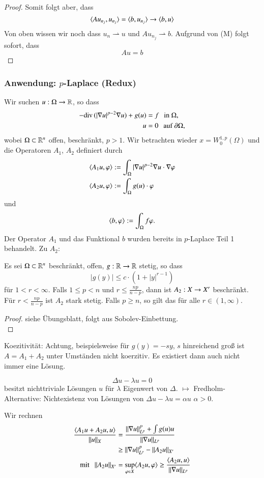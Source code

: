 \begin{proof}
    \noindent Somit folgt aber, dass
    \[
        \langle Au_{n_j}, u_{n_j} \rangle = \langle b,u_{n_j}\rangle \rightarrow \langle b,u\rangle
    \]
    Von oben wissen wir noch dass $u_n\rightharpoonup u$ und $Au_{n_j}\rightharpoonup b$. Aufgrund von
    (M) folgt sofort, dass
    \[
        Au=b
    \]
\end{proof}

\subsubsection*{Anwendung: $p$-Laplace (Redux)}

Wir suchen $u:\Omega\rightarrow \mathbb{R}$, so dass
\begin{align*}
    -\mathrm{div}\, (|\nabla u |^{p-2}\nabla u) + g(u)&= f \hspace{.25cm} \text{in }\Omega,\\
     u&=0 \hspace{.25cm}\text{auf }\partial \Omega,
\end{align*}
wobei $\Omega\subset\mathbb{R}^n$ offen, beschränkt, $p>1$. Wir betrachten wieder $x=W^{1,p}_0(\Omega)$ und die
Operatoren $A_1$, $A_2$ definiert durch
\begin{align*}
    \langle A_1u,\varphi\rangle &:= \int_{\Omega} |\nabla u |^{p-2} \nabla u \cdot \nabla\varphi\\
    \langle A_2u,\varphi\rangle &:= \int_\Omega g(u)\cdot \varphi
\end{align*}
und
\[
    \langle b,\varphi \rangle := \int_\Omega f\varphi.
\]
Der Operator $A_1$ und das Funktional $b$ wurden bereits in $p$-Laplace Teil 1 behandelt. Zu $A_2$:

\begin{lem}\label{4.17}
    Es sei $\Omega\subset \mathbb{R}^n$ beschränkt, offen, $g:\mathbb{R}\rightarrow \mathbb{R}$ stetig, so dass
    \[
        |g(y)|\leq c \cdot(1+|y|^{r-1})
    \]
    für  $1<r<\infty$.
    Falls $1\leq p < n$ und $r\leq \frac{np}{n-p}$, dann ist $A_2:X\rightarrow X'$ beschränkt. Für
    $r<\frac{np}{n-p}$ ist $A_2$ stark stetig. Falls $p\geq n$, so gilt das für alle $r\in (1,\infty)$.
\end{lem}

\begin{proof}
    siehe Übungsblatt, folgt aus Sobolev-Einbettung.\[ \]
\end{proof}

\noindent Koezitivität: Achtung, beispielsweise für $g(y)=-sy$, $s$ hinreichend groß ist $A=A_1+A_2$
unter Umständen nicht koerzitiv. Es existiert dann auch nicht immer eine Lösung.

\begin{beispiel}
\[
    \Delta u - \lambda u=0
\]
besitzt nichttriviale Lösungen $u$ für $\lambda$ Eigenwert von $\Delta$.
$\mapsto$ Fredholm-Alternative: Nichtexistenz von Lösungen von $\Delta u - \lambda u = \alpha u$
$\alpha>0$.

Wir rechnen
\begin{align*}
    \frac{\langle A_1u+A_2u,u\rangle}{\|u\|_X} &= \frac{\|\nabla u\|_{L^p}^p+\int g(u)u}{\|\nabla u\|_{L^p}}\\
    &\geq \|\nabla u\|_{L^p}^p - {\|A_2u\|_{X'}}\\
    \text{mit} \hspace{.25cm} \|A_2u\|_{X'} &= \sup_{\varphi \in X} \langle A_2u, \varphi \rangle \geq \frac{\langle A_2 u , u\rangle}
    {\|\nabla u\|_{L^p}}
\end{align*}
\end{beispiel}


